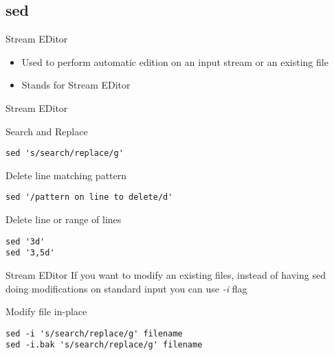 \subsection{sed}

\begin{frame}[fragile]{Stream EDitor}
  \begin{itemize}
    \item Used to perform automatic edition on an input stream or an existing file
    \pause
    \item Stands for Stream EDitor
  \end{itemize}
\end{frame}

\begin{frame}[fragile]{Stream EDitor}
  \begin{exampleblock}{Search and Replace}
    \begin{lstlisting}[showstringspaces=false,basicstyle=\tiny]
sed 's/search/replace/g'
    \end{lstlisting}
  \end{exampleblock}
  \pause

  \begin{exampleblock}{Delete line matching pattern}
    \begin{lstlisting}[showstringspaces=false,basicstyle=\tiny]
sed '/pattern on line to delete/d'
    \end{lstlisting}
  \end{exampleblock}
  \pause

  \begin{exampleblock}{Delete line or range of lines}
    \begin{lstlisting}[showstringspaces=false,basicstyle=\tiny]
sed '3d'
sed '3,5d'
    \end{lstlisting}
  \end{exampleblock}
\end{frame}

\begin{frame}[fragile]{Stream EDitor}
If you want to modify an existing files, instead of having sed doing modifications on standard input you can use \emph{-i} flag
\pause
  \begin{exampleblock}{Modify file in-place}
    \begin{lstlisting}[showstringspaces=false,basicstyle=\tiny]
sed -i 's/search/replace/g' filename
sed -i.bak 's/search/replace/g' filename
    \end{lstlisting}
  \end{exampleblock}
\end{frame}

